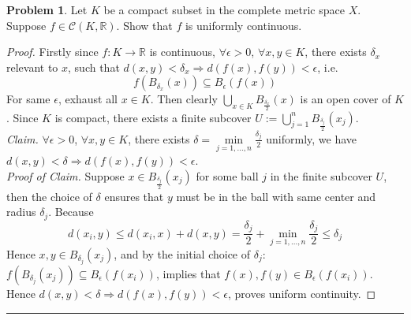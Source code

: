 \documentclass[a4paper, 10pt]{article}
\theoremstyle{definition}
\newtheorem{problem}{Problem}
\theoremstyle{hSol}
\begin{document}
\begin{problem} Let $K$ be a compact subset in the complete metric space $X$. Suppose $f\in \mathcal{C}(K, \mathbb{R})$. Show that $f$ is uniformly continuous.
\end{problem}
\begin{proof} Firstly since $f: K\to \mathbb{R}$ is continuous, $\forall \epsilon>0$, $\forall x,y\in K$, there exists $\delta_x$ relevant to $x$, such that $d(x,y)<\delta_x \Rightarrow d(f(x),f(y))<\epsilon$, i.e. 
\begin{equation}
  f(B_{\delta_x}(x)) \subseteq B_{\epsilon}(f(x))
\end{equation}
For same $\epsilon$, exhaust all $x\in K$. Then clearly $\bigcup_{x\in K}B_{\frac{\delta_x}{2}}(x)$ is an open cover of $K$. Since $K$ is compact, there exists a finite subcover $U:=\bigcup_{j=1}^n B_{\frac{\delta_{j}}{2}}(x_j)$.\\
\textit{Claim.} $\forall \epsilon>0$, $\forall x,y\in K$, there exists $\delta=\min\limits_{j=1,...,n}\frac{\delta_j}{2}$ uniformly, we have $d(x,y)<\delta \Rightarrow d(f(x),f(y))<\epsilon$.\\
\textit{Proof of Claim.} Suppose $x\in B_{\frac{\delta_{j}}{2}}(x_j)$ for some ball $j$ in the finite subcover $U$, then the choice of $\delta$ ensures that $y$ must be in the ball with same center and radius $\delta_j$. Because
\begin{equation}
  d(x_i,y)\leq d(x_i, x)+d(x,y)=\frac{\delta_j}{2}+\min\limits_{j=1,...,n}\frac{\delta_j}{2} \leq \delta_j
\end{equation}
Hence $x,y \in B_{\delta_j}(x_j)$, and by the initial choice of $\delta_j$: $f(B_{\delta_j}(x_j))\subseteq B_{\epsilon}(f(x_i))$, implies that $f(x), f(y) \in B_{\epsilon}(f(x_i))$. Hence $d(x,y)<\delta \Rightarrow d(f(x),f(y))< \epsilon$, proves uniform continuity.
\end{proof}

\noindent\rule{16cm}{0.4pt}
\end{document}
